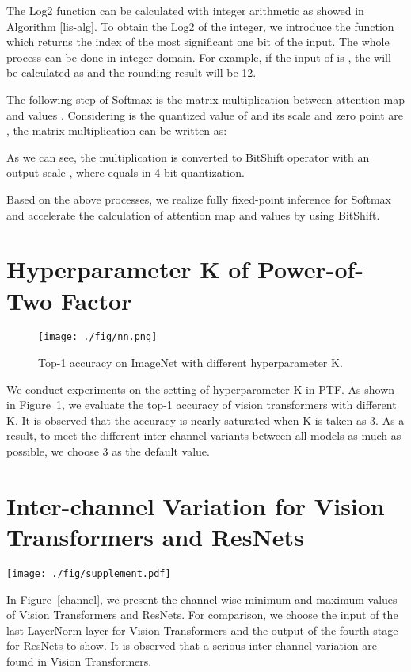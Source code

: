\documentclass{article}
\begin{document}
The Log2 function can be calculated with integer arithmetic as showed in Algorithm \ref{lis-alg}. To obtain the Log2 of the integer, we introduce the  function which returns the index of the most significant one bit of the input. The whole process can be done in integer domain.
For example, if the input of  is , the  will be calculated as  and the rounding result will be 12.

The following step of Softmax is the matrix multiplication between attention map  and values . Considering  is the quantized value of  and its scale and zero point are , the matrix multiplication can be written as:

As we can see, the multiplication is converted to BitShift operator with an output scale , where  equals  in 4-bit quantization.


Based on the above processes, we realize fully fixed-point inference for Softmax and accelerate the calculation of attention map and values by using BitShift.


\section{Hyperparameter \textrm{K} of Power-of-Two Factor}
\begin{figure}[t]
\centering
\texttt{[image: ./fig/nn.png]}
\caption{Top-1 accuracy on ImageNet with different hyperparameter K.}
\label{K}
\end{figure}

We conduct experiments on the setting of hyperparameter \textrm{K} in PTF. As shown in Figure~\ref{K}, we evaluate the top-1 accuracy of vision transformers with different \textrm{K}. It is observed that the accuracy is nearly saturated when \textrm{K} is taken as 3. As a result, to meet the different inter-channel variants between all models as much as possible, we choose 3 as the default value.

\section{Inter-channel Variation for Vision Transformers and ResNets}
\begin{figure*}[t]
    \centering
    \texttt{[image: ./fig/supplement.pdf]}
    \caption{Channel-wise minimum and maximum values of Vision Transformers and ResNets.}
    \label{channel}
\end{figure*}
In Figure~\ref{channel}, we present the channel-wise minimum and maximum values of Vision Transformers and ResNets. For comparison, we choose the input of the last LayerNorm layer for Vision Transformers and the output of the fourth stage for ResNets to show. It is observed that a serious inter-channel variation are found in Vision Transformers.
 
\end{document}
